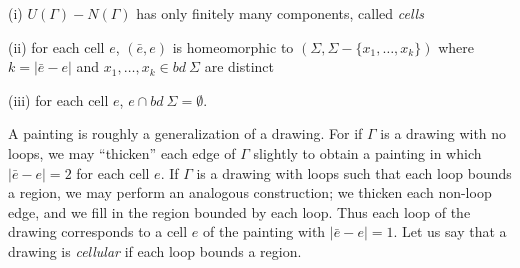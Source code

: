 \hspace*{12pt}(i) $U(\Gamma) - N(\Gamma)$ has only finitely many components, called \textit{cells}

\hspace*{12pt}(ii) for each cell $e$, $(\bar{e}, e)$ is homeomorphic to $(\Sigma, \Sigma - \{x_1, \dots, x_k\})$ where $k = |\bar{e} - e|$ and $x_1, \dots, x_k \in bd\ \Sigma$ are distinct

\hspace*{12pt}(iii) for each cell $e$, $e \cap bd\ \Sigma = \emptyset$.

A painting is roughly a generalization of a drawing. For if $\Gamma$ is a drawing with no loops, we may ``thicken'' each edge of $\Gamma$ slightly to obtain a painting in which $|\bar{e} - e| = 2$ for each cell $e$. If $\Gamma$ is a drawing with loops such that each loop bounds a region, we may perform an analogous construction; we thicken each non-loop edge, and we fill in the region bounded by each loop. Thus each loop of the drawing corresponds to a cell $e$ of the painting with $|\bar{e} - e| = 1$. Let us say that a drawing is \textit{cellular} if each loop bounds a region.
